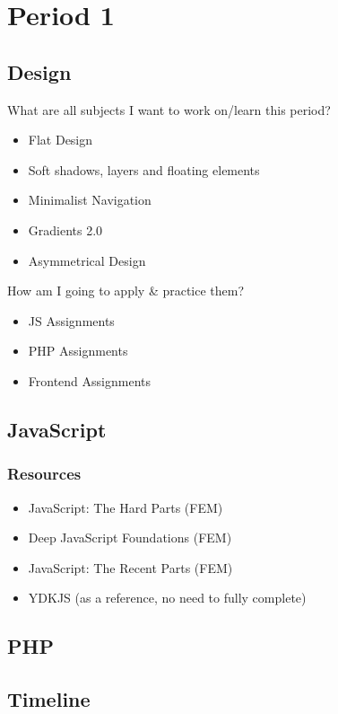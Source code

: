 \section{Period 1}

\subsection{Design}
What are all subjects I want to work on/learn this period?

\begin{itemize}
  \item Flat Design
  \item Soft shadows, layers and floating elements
  \item Minimalist Navigation
  \item Gradients 2.0
  \item Asymmetrical Design
\end{itemize}

How am I going to apply \& practice them?
\begin{itemize}
  \item JS Assignments
  \item PHP Assignments
  \item Frontend Assignments
\end{itemize}


\subsection{JavaScript}

\subsubsection{Resources}
  \begin{itemize}
    \item{JavaScript: The Hard Parts (FEM)}
    \item{Deep JavaScript Foundations (FEM)}
    \item{JavaScript: The Recent Parts (FEM)}
    \item{YDKJS (as a reference, no need to fully complete)}
  \end{itemize}

\subsection{PHP}


\subsection{Timeline}


